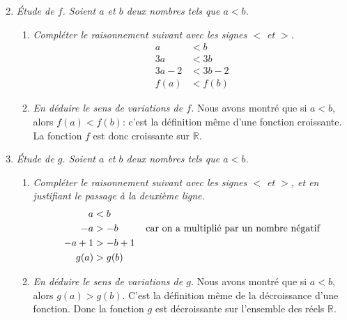 \documentclass[11pt]{article}
\begin{document}
\begin{exercice}
\begin{enumerate}
\begin{multicols}{2}
      \begin{center}
      \end{center}
      \end{multicols}
    \item \emph{Étude de $f$. Soient $a$ et $b$ deux nombres tels que $a<b$.}
      \begin{enumerate}
        \item \emph{Compléter le raisonnement suivant avec les signes $<$ et $>$.}
          \begin{align*}
            a &< b\\
            3a & < 3b\\
            3a-2 &< 3b-2\\
            f(a) &< f(b)
          \end{align*}
        \item \emph{En déduire le sens de variations de $f$.}
          Nous avons montré que si $a<b$, alors $f(a)<f(b)$: c'est la définition même d'une fonction croissante. La fonction $f$ est donc croissante sur $\mathbb{R}$.
      \end{enumerate}
    \item \emph{\emph{Étude de $g$.} Soient $a$ et $b$ deux nombres tels que $a<b$.}
      \begin{enumerate}
        \item \emph{Compléter le raisonnement suivant avec les signes $<$ et $>$, et en justifiant le passage à la deuxième ligne.}
          \begin{align*}
            a &< b\\
            -a & > -b \text{\hspace{1cm}car on a multiplié par un nombre négatif}\\
            -a+1 &> -b+1\\
            g(a) &> g(b)
          \end{align*}
        \item \emph{En déduire le sens de variations de $g$.}
          Nous avons montré que si $a<b$, alors $g(a)>g(b)$. C'est la définition même de la décroissance d'une fonction. Donc la fonction $g$ est décroissante sur l'ensemble des réels $\mathbb{R}$.
      \end{enumerate}
  \end{enumerate}
\end{exercice}
\end{document}
